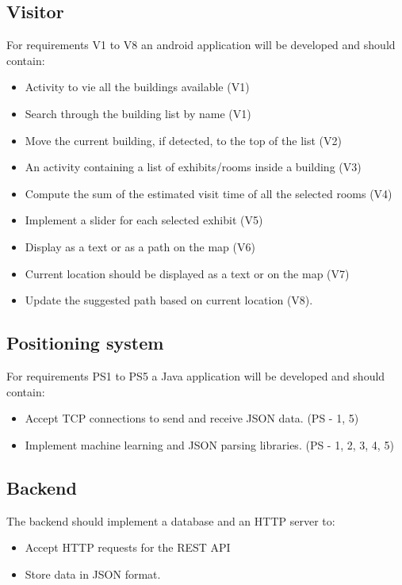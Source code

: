 \subsection{Visitor}
For requirements V1 to V8 an android application will be developed and should contain:
	\begin{itemize}
		\item Activity to vie all the buildings available (V1)
		\item Search through the building list by name (V1)
		\item Move the current building, if detected, to the top of the list (V2)
		\item An activity containing a list of exhibits/rooms inside a building (V3)
		\item Compute the sum of the estimated visit time of all the selected rooms (V4)
		\item Implement a slider for each selected exhibit (V5)
		\item Display as a text or as a path on the map (V6)
		\item Current location should be displayed as a text or on the map (V7)
		\item Update the suggested path based on current location (V8).
	\end{itemize}

\subsection{Positioning system}
For requirements PS1 to PS5 a Java application will be developed and should contain:
	\begin{itemize}
		\item Accept TCP connections to send and receive JSON data. (PS - 1, 5)
		\item Implement machine learning and JSON parsing libraries. (PS - 1, 2, 3, 4, 5)
	\end{itemize}

\subsection{Backend}
The backend should implement a database and an HTTP server to:
	\begin{itemize}
		\item Accept HTTP requests for the REST API
		\item Store data in JSON format.
	\end{itemize}

